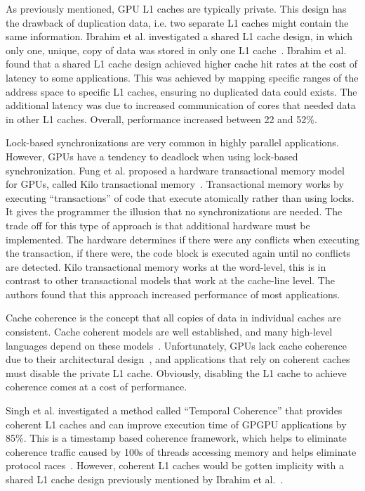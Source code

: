 \documentclass[conference]{IEEEtran}
\begin{document}
As previously mentioned, GPU L1 caches are typically private.
This design has the drawback of duplication data, i.e. two separate L1 caches might contain the same information.
Ibrahim et al. investigated a shared L1 cache design, in which only one, unique, copy of data was stored in only one L1 cache~\cite{Ibrahim2020}.
Ibrahim et al. found that a shared L1 cache design achieved higher cache hit rates at the cost of latency to some applications.
This was achieved by mapping specific ranges of the address space to specific L1 caches, ensuring no duplicated data could exists.
The additional latency was due to increased communication of cores that needed data in other L1 caches.
Overall, performance increased between 22 and 52\%.

Lock-based synchronizations are very common in highly parallel applications.
However, GPUs have a tendency to deadlock when using lock-based synchronization.
Fung et al. proposed a hardware transactional memory model for GPUs, called Kilo transactional memory~\cite{Fung2011ISM}.
Transactional memory works by executing ``transactions'' of code that execute atomically rather than using locks.
It gives the programmer the illusion that no synchronizations are needed.
The trade off for this type of approach is that additional hardware must be implemented.
The hardware determines if there were any conflicts when executing the transaction, if there were, the code block is executed again until no conflicts are detected.
Kilo transactional memory works at the word-level, this is in contrast to other transactional models that work at the cache-line level.
The authors found that this approach increased performance of most applications.

Cache coherence is the concept that all copies of data in individual caches are consistent.
Cache coherent models are well established, and many high-level languages depend on these models~\cite{Singh2013}.
Unfortunately, GPUs lack cache coherence due to their architectural design~\cite{Singh2013}, and applications that rely on coherent caches must disable the private L1 cache.
Obviously, disabling the L1 cache to achieve coherence comes at a cost of performance.

Singh et al. investigated a method called ``Temporal Coherence'' that provides coherent L1 caches and can improve execution time of GPGPU applications by 85\%. This is a timestamp based coherence framework, which helps to eliminate coherence traffic caused by 100s of threads accessing memory and helps eliminate protocol races~\cite{Singh2013}.
However, coherent L1 caches would be gotten implicity with a shared L1 cache design previously mentioned by Ibrahim et al.~\cite{Ibrahim2020}.
\end{document}
